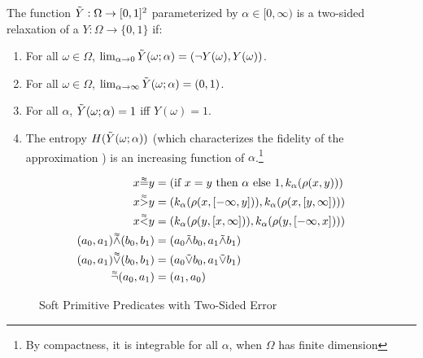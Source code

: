 \begin{definition}
The function $\tilde{Y} : \Omega \to [0, 1]^2$ parameterized by $\alpha \in [0, \infty)$ is a two-sided relaxation of a $Y: \Omega \to \{0, 1\}$ if:
\begin{enumerate}[label=(\roman*)]
	\label{def:temp}
	\item For all $\omega \in \Omega$, $\lim_{\alpha \to 0}\tilde{Y}(\omega; \alpha) = (\neg Y(\omega), Y(\omega))$.
	\item For all $\omega \in \Omega$, $\lim_{\alpha \to \infty}\tilde{Y}(\omega; \alpha) = (0, 1)$.

    \item For all $\alpha$, $\tilde{Y}(\omega; \alpha) = 1$ iff $Y(\omega) = 1$.
    \item The entropy $H(\tilde{Y}(\omega; \alpha))$ (which characterizes the fidelity of the approximation ) is an increasing function of $\alpha$.\footnote
    {By compactness, it is integrable for all $\alpha$, when $\Omega$ has finite dimension}
\end{enumerate}
\end{definition}


\begin{figure}\label{softw}
\begin{align*}
x \accentset{\approx}{=} y &= (\text{if } x = y  \text{ then } \alpha \text{ else } 1, k_\alpha(\rho(x, y)))\\
x \accentset{\approx}{>} y &= (k_\alpha(\rho(x, [-\infty, y])), k_\alpha(\rho(x, [y, \infty])))\\
x \accentset{\approx}{<} y &= (k_\alpha(\rho(y, [x, \infty])), k_\alpha(\rho(y, [-\infty, x])))\\
(a_0, a_1) \accentset{\approx}{\land} (b_0, b_1) &= (a_0 \tilde{\land} b_0, a_1 \tilde{\land} b_1)\\
(a_0, a_1) \accentset{\approx}{\lor} (b_0, b_1) &= (a_0 \tilde{\lor} b_0, a_1 \tilde{\lor} b_1)\\
\accentset{\approx}{\neg}(a_0, a_1) &= (a_1, a_0)
\end{align*}
\caption{Soft Primitive Predicates with Two-Sided Error}
\end{figure}




